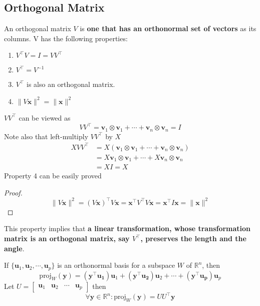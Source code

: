 \subsection{Orthogonal Matrix}
An orthogonal matrix $V$ is \textbf{one that has an orthonormal set of vectors} as its columns.
V has the following properties:
\begin{enumerate}
    \item $V^{\top}V = I = VV^{\top}$
    \item$ V^{\top} = V^{-1}$
    \item $V^{\top}$ is also an orthogonal matrix.
    \item $\lVert V\mathbf{x} \rVert^2 = \lVert \mathbf{x}\rVert^2$
\end{enumerate}
$VV^{\top}$ can be viewed as
\begin{equation}
   VV^{\top} = \mathbf{v}_1 \otimes \mathbf{v}_1 + \cdots + \mathbf{v}_n \otimes \mathbf{v}_n = I
\end{equation}
Note also that left-multiply $VV^{\top}$ by $X$
\begin{align}
        XVV^{\top} &= X(\mathbf{v}_1 \otimes \mathbf{v}_1 + \cdots + \mathbf{v}_n \otimes \mathbf{v}_n)\\
        & = X \mathbf{v}_1 \otimes \mathbf{v}_1 + \cdots + X \mathbf{v}_n \otimes \mathbf{v}_n\\
        & = XI = X
\end{align}
Property 4 can be easily proved
\begin{proof}
    \begin{equation}
        \lVert V\mathbf{x} \rVert^2 = (V\mathbf{x})^{\top}V\mathbf{x} = \mathbf{x}^{\top}V^{\top}V \mathbf{x} = \mathbf{x}^{\top}I \mathbf{x} =  \lVert \mathbf{x}\rVert^2
    \end{equation}
\end{proof}
\noindent
This property implies that \textbf{a linear transformation, whose transformation matrix is an orthogonal matrix, say $V^{\top}$, preserves the length and the angle}.

\begin{Thm}\label{orthonormal-projection}
    If $\{\mathbf{u}_1, \mathbf{u}_2, \cdots, \mathbf{u}_p \}$ is an orthonormal basis for a subspace $W$ of $\mathbb{R}^n$, then
    \begin{equation*}
        \text{proj}_{W}(\mathbf{y}) = (\mathbf{y}^{\top}\mathbf{u_1})\mathbf{u}_1 + (\mathbf{y}^{\top}\mathbf{u_2})\mathbf{u}_2 + \cdots + 
        (\mathbf{y}^{\top}\mathbf{u_p})\mathbf{u}_p
    \end{equation*}
    Let $U = \begin{bmatrix}
        \mathbf{u}_1 & \mathbf{u}_2  & \cdots & \mathbf{u}_p
    \end{bmatrix}$
    then
    \begin{equation}
        \forall \mathbf{y}\in \mathbb{R}^n: \text{proj}_{W}(\mathbf{y}) = UU^{\top}\mathbf{y}
    \end{equation}
\end{Thm}

